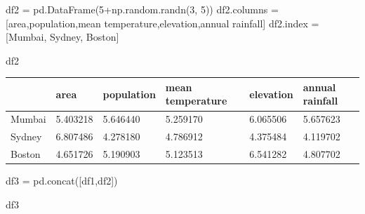 \documentclass[
  letterpaper,
  DIV=11,
  numbers=noendperiod]{scrreprt}
\newenvironment{Shaded}{\begin{snugshade}}{\end{snugshade}}
\newcommand{\DecValTok}[1]{\textcolor[rgb]{0.68,0.00,0.00}{#1}}
\newcommand{\NormalTok}[1]{\textcolor[rgb]{0.00,0.23,0.31}{#1}}
\newcommand{\OperatorTok}[1]{\textcolor[rgb]{0.37,0.37,0.37}{#1}}
\newcommand{\StringTok}[1]{\textcolor[rgb]{0.13,0.47,0.30}{#1}}
\begin{document}
\begin{Shaded}
\begin{Highlighting}[]
\NormalTok{df2 }\OperatorTok{=}\NormalTok{ pd.DataFrame(}\DecValTok{5}\OperatorTok{+}\NormalTok{np.random.randn(}\DecValTok{3}\NormalTok{, }\DecValTok{5}\NormalTok{))}
\NormalTok{df2.columns }\OperatorTok{=}\NormalTok{ [}\StringTok{\textquotesingle{}area\textquotesingle{}}\NormalTok{,}\StringTok{\textquotesingle{}population\textquotesingle{}}\NormalTok{,}\StringTok{\textquotesingle{}mean temperature\textquotesingle{}}\NormalTok{,}\StringTok{\textquotesingle{}elevation\textquotesingle{}}\NormalTok{,}\StringTok{\textquotesingle{}annual rainfall\textquotesingle{}}\NormalTok{]}
\NormalTok{df2.index }\OperatorTok{=}\NormalTok{ [}\StringTok{\textquotesingle{}Mumbai\textquotesingle{}}\NormalTok{, }\StringTok{\textquotesingle{}Sydney\textquotesingle{}}\NormalTok{, }\StringTok{\textquotesingle{}Boston\textquotesingle{}}\NormalTok{]}
\end{Highlighting}
\end{Shaded}

\begin{Shaded}
\begin{Highlighting}[]
\NormalTok{df2}
\end{Highlighting}
\end{Shaded}

\begin{longtable}[]{@{}llllll@{}}
\toprule()
& area & population & mean temperature & elevation & annual rainfall \\
\midrule()
\endhead
Mumbai & 5.403218 & 5.646440 & 5.259170 & 6.065506 & 5.657623 \\
Sydney & 6.807486 & 4.278180 & 4.786912 & 4.375484 & 4.119702 \\
Boston & 4.651726 & 5.190903 & 5.123513 & 6.541282 & 4.807702 \\
\bottomrule()
\end{longtable}

\begin{Shaded}
\begin{Highlighting}[]
\NormalTok{df3 }\OperatorTok{=}\NormalTok{ pd.concat([df1,df2])}
\end{Highlighting}
\end{Shaded}

\begin{Shaded}
\begin{Highlighting}[]
\NormalTok{df3}
\end{Highlighting}
\end{Shaded}
\end{document}
